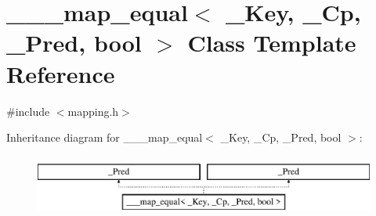 \hypertarget{class______map__equal}{}\section{\+\_\+\+\_\+\+\_\+map\+\_\+equal$<$ \+\_\+\+Key, \+\_\+\+Cp, \+\_\+\+Pred, bool $>$ Class Template Reference}
\label{class______map__equal}


{\ttfamily \#include $<$mapping.\+h$>$}

Inheritance diagram for \+\_\+\+\_\+\+\_\+map\+\_\+equal$<$ \+\_\+\+Key, \+\_\+\+Cp, \+\_\+\+Pred, bool $>$\+:\begin{figure}[H]
\begin{center}
\leavevmode
\includegraphics[height=2.000000cm]{class______map__equal}
\end{center}
\end{figure}
